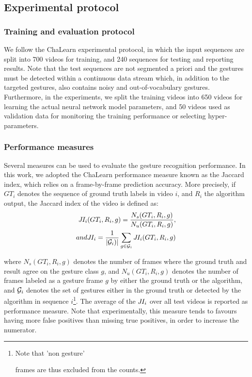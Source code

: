 \subsection{Experimental protocol}

\subsubsection{Training and evaluation protocol}

We follow the ChaLearn experimental protocol, in which the input sequences are split into 700 videos for training, and 240 sequences for testing and reporting results.
Note that the   test sequences  are not segmented a priori and the gestures must be detected within a continuous data stream
which, in addition to the targeted gestures, also contains noisy and out-of-vocabulary gestures.
%
Furthermore, in the experiments, we split the training videos into 650 videos for learning the actual neural network model parameters, and 50 videos
used as validation data for monitoring the training performance or selecting hyper-parameters.


\subsubsection{Performance measures}

Several measures can be used to evaluate the gesture recognition performance.
%
In this work, we adopted the ChaLearn performance measure known as the Jaccard index, which relies on a frame-by-frame prediction accuracy.
More precisely, if $GT_i$ denotes the sequence of ground truth labels in video $i$, and $R_i$ the algorithm output, the Jaccard index
of the video is defined as:
\begin{align}
\jaccardindex_i(GT_i, R_i,g) = \frac{N_s(GT_i, R_i,g)}{N_u(GT_i, R_i,g)},
\\
\mbox{and } \jaccardindex_i = \frac{1}{|{\cal G}_i)|} \sum_{g \in {\cal G}_i} \jaccardindex_i(GT_i, R_i,g)
\end{align}

where $N_s(GT_i, R_i, g)$ denotes the number of frames where the ground truth and result agree on the gesture class $g$,
and $N_u(GT_i, R_i, g)$ denotes the number of frames labeled as a gesture frame $g$ by  either the ground truth or the algorithm,
and ${{\cal G}_i}$ denotes the set of gestures either in the ground truth or detected by the algorithm in sequence $i$\footnote{Note that 'non gesture'

frames are thus excluded from the counts.}. The average of the $J\hspace*{-0.1em}I_i$ over all test videos is reported as performance measure.
%
Note that experimentally, this measure tends to favours having more false positives than missing true positives, in order to increase the numerator.

